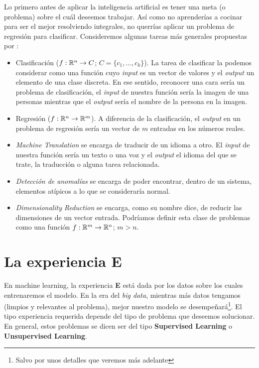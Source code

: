\documentclass[11pt]{article}
\begin{document}
Lo primero antes de aplicar la inteligencia artificial es tener una meta (o problema) sobre el cuál deseemos trabajar. Así como no aprenderías a cocinar para ser el mejor resolviendo integrales, no querrías aplicar un problema de regresión para clasificar. Consideremos algunas tareas más generales propuestas por \cite{Goodfellow-et-al-2016} :
\begin{itemize}
	\item Clasificación ($f: \mathbb{R}^n \to C$; $C = \{c_1, \ldots, c_k\}$). La tarea de clasificar la podemos considerar como una función cuyo \textit{input} es un vector de valores y el \textit{output} un elemento de una clase discreta. En ese sentido, reconocer una cara sería un problema de clasificación, el \textit{input} de nuestra función sería la imagen de una personas mientras que el \textit{output} sería el nombre de la persona en la imagen.
	\item Regresión ($f: \mathbb{R}^n \to \mathbb{R}^m$). A diferencia de la clasificación, el \textit{output} en un problema de regresión sería un vector de $m$ entradas en los números reales.
	\item \textit{Machine Translation} se encarga de traducir de un idioma a otro. El \textit{input} de nuestra función sería un texto o una voz y el \textit{output} el idioma del que se trate, la traducción o alguna tarea relacionada.
	\item \textit{Detección de anomalías} se encarga de poder encontrar, dentro de un sistema, elementos atípicos a lo que se consideraría normal.
	\item \textit{Dimensionality Reduction} se encarga, como su nombre dice, de reducir las dimensiones de un vector entrada. Podríamos definir esta clase de problemas como una función $f: \mathbb{R}^m \to \mathbb{R}^n$; $m > n$. 
\end{itemize}

\section{La experiencia \textbf{E}}
En machine learning, la experiencia \textbf{E} está dada por los datos sobre los cuales entrenaremos el modelo. En la era del \textit{big data}, mientras más datos tengamos (limpios  y relevantes al problema), mejor nuestro modelo se desempeñará\footnote{Salvo por unos detalles que veremos más adelante}. El tipo experiencia requerida depende del tipo de problema que deseemos solucionar. En general, estos problemas se dicen ser del tipo \textbf{Supervised Learning} o \textbf{Unsupervised Learning}.\\
\end{document}
